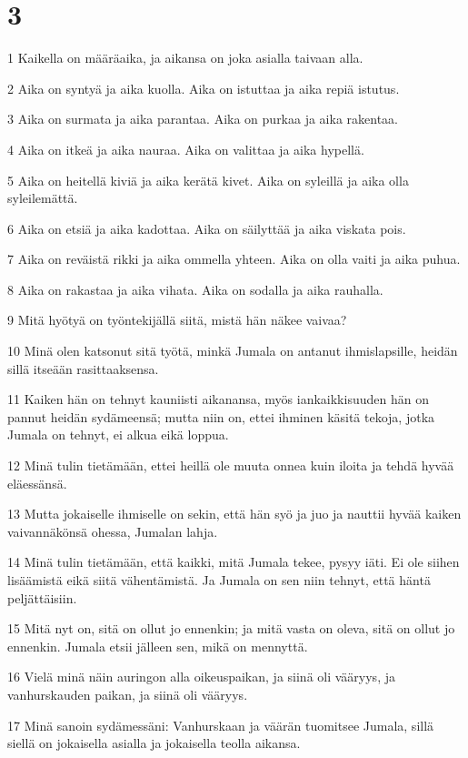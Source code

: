 \chapter{3}

\par 1 Kaikella on määräaika, ja aikansa on joka asialla taivaan alla.
\par 2 Aika on syntyä ja aika kuolla. Aika on istuttaa ja aika repiä istutus.
\par 3 Aika on surmata ja aika parantaa. Aika on purkaa ja aika rakentaa.
\par 4 Aika on itkeä ja aika nauraa. Aika on valittaa ja aika hypellä.
\par 5 Aika on heitellä kiviä ja aika kerätä kivet. Aika on syleillä ja aika olla syleilemättä.
\par 6 Aika on etsiä ja aika kadottaa. Aika on säilyttää ja aika viskata pois.
\par 7 Aika on reväistä rikki ja aika ommella yhteen. Aika on olla vaiti ja aika puhua.
\par 8 Aika on rakastaa ja aika vihata. Aika on sodalla ja aika rauhalla.
\par 9 Mitä hyötyä on työntekijällä siitä, mistä hän näkee vaivaa?
\par 10 Minä olen katsonut sitä työtä, minkä Jumala on antanut ihmislapsille, heidän sillä itseään rasittaaksensa.
\par 11 Kaiken hän on tehnyt kauniisti aikanansa, myös iankaikkisuuden hän on pannut heidän sydämeensä; mutta niin on, ettei ihminen käsitä tekoja, jotka Jumala on tehnyt, ei alkua eikä loppua.
\par 12 Minä tulin tietämään, ettei heillä ole muuta onnea kuin iloita ja tehdä hyvää eläessänsä.
\par 13 Mutta jokaiselle ihmiselle on sekin, että hän syö ja juo ja nauttii hyvää kaiken vaivannäkönsä ohessa, Jumalan lahja.
\par 14 Minä tulin tietämään, että kaikki, mitä Jumala tekee, pysyy iäti. Ei ole siihen lisäämistä eikä siitä vähentämistä. Ja Jumala on sen niin tehnyt, että häntä peljättäisiin.
\par 15 Mitä nyt on, sitä on ollut jo ennenkin; ja mitä vasta on oleva, sitä on ollut jo ennenkin. Jumala etsii jälleen sen, mikä on mennyttä.
\par 16 Vielä minä näin auringon alla oikeuspaikan, ja siinä oli vääryys, ja vanhurskauden paikan, ja siinä oli vääryys.
\par 17 Minä sanoin sydämessäni: Vanhurskaan ja väärän tuomitsee Jumala, sillä siellä on jokaisella asialla ja jokaisella teolla aikansa.
